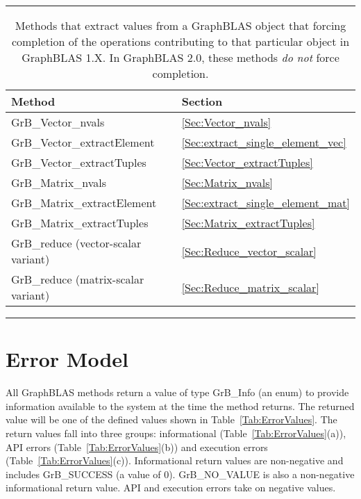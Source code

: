 \begin{table}[htb]
    \hrule
    \begin{center}
        \caption{Methods that extract values from a GraphBLAS object that 
        forcing completion of the operations contributing to that particular object in GraphBLAS 1.X. 
        In GraphBLAS 2.0, these methods \emph{do not} force completion.}
        \label{Tab:ExtractMethods}

        \begin{tabular}{l|l}
            Method    					& Section 				\\ \hline

            {\sf GrB\_Vector\_nvals}        		& \ref{Sec:Vector_nvals}        	\\
            {\sf GrB\_Vector\_extractElement}     	& \ref{Sec:extract_single_element_vec}  \\
            {\sf GrB\_Vector\_extractTuples}    	& \ref{Sec:Vector_extractTuples}    	\\
            {\sf GrB\_Matrix\_nvals}        		& \ref{Sec:Matrix_nvals}        	\\
            {\sf GrB\_Matrix\_extractElement}     	& \ref{Sec:extract_single_element_mat}  \\
            {\sf GrB\_Matrix\_extractTuples}    	& \ref{Sec:Matrix_extractTuples}    	\\
            {\sf GrB\_reduce} (vector-scalar variant)   & \ref{Sec:Reduce_vector_scalar}        \\
            {\sf GrB\_reduce} (matrix-scalar variant)   & \ref{Sec:Reduce_matrix_scalar}        \\
        \end{tabular}
    \end{center}
    \hrule
\end{table}




\section{Error Model}
\label{Sec:ErrorModel}

All GraphBLAS methods return a value of type {\sf GrB\_Info} (an enum) to provide
information available to the system at the time the method returns. The
returned value will be one of the defined values shown in 
Table~\ref{Tab:ErrorValues}. The return values fall into three groups: 
informational (Table~\ref{Tab:ErrorValues}(a)), API errors 
(Table~\ref{Tab:ErrorValues}(b)) and execution errors 
(Table~\ref{Tab:ErrorValues}(c)).  Informational return values are 
non-negative and includes {\sf GrB\_SUCCESS} (a value of 0).  {\sf GrB\_NO\_VALUE} 
is also a non-negative informational return value.  API and execution errors
take on negative values.

